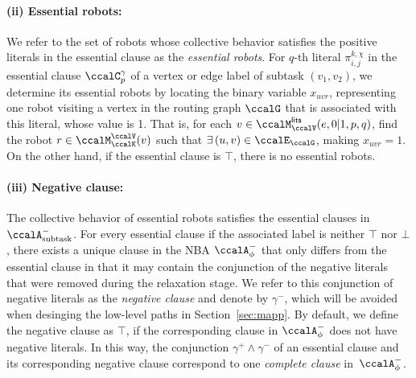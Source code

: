 \documentclass[Afour,sageh,times]{sagej}
\newcommand{\auto}[1]{\ccalA_{\textup{#1}}}
\newcommand{\autop}{\ccalA_{\phi}}
\renewcommand{\ap}[3]{\mathcal{\pi}_{{#1},{#2}}^{#3}}
\begin{document}
{{   \paragraph{(ii) Essential robots:} We refer to the set of robots whose collective behavior satisfies the positive literals in the essential clause as the {\it essential robots}. For $q$-th literal $\ap{i}{j}{k,\chi}$ in the essential clause $\ccalC_p^\gamma$ of a vertex or edge label of subtask $(v_1, v_2)$, we determine its essential robots by locating the binary variable $x_{uvr}$, representing one robot visiting a vertex in the routing graph $\ccalG$ that is associated with this literal, whose value is 1. That is, for each $v\in \ccalM_{\ccalV}^\mathsf{lits} (e, 0|1, p, q)$, find the robot $r\in \ccalM_\ccalK^\ccalV(v)$ such that $\exists\, (u,v)\in\ccalE_\ccalG$, making $x_{uvr}=1$.  On the other hand, if the essential clause is $\top$, there is no essential robots.
   \paragraph{(iii) Negative clause:} The collective behavior of essential robots satisfies the essential clauses in $\auto{subtask}^-$. For every essential clause if the associated label is neither $\top$ nor $\bot$, there exists a unique clause in the NBA $\autop^-$ that only differs from the essential clause in that it may contain the conjunction of the negative literals that were removed during the relaxation stage. We refer to this conjunction of negative literals  as the {\it negative clause} and denote by $\gamma^-$, which will be avoided when desinging the low-level paths in Section~\ref{sec:mapp}. By default, we  define the negative clause as $\top$, if the corresponding clause in $\autop^-$ does not have negative literals. In this way, the conjunction $\gamma^+ \wedge \gamma^-$ of an essential  clause and its corresponding negative clause correspond to  one {\it complete clause} in~$\autop^-$.

}}
\end{document}
